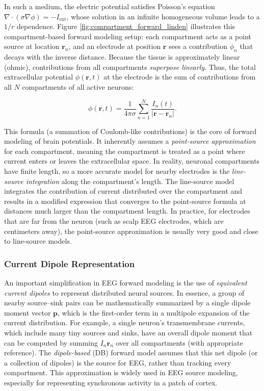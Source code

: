 \documentclass[final, a4paper,masters,en,listoffigures,listoftables,norwegiandates]{NMBU}
\begin{document}
In such a medium, the electric potential satisfies Poisson’s equation $\nabla \cdot (\sigma \nabla \phi) = -I_{\text{ext}}$, whose solution in an infinite homogeneous volume leads to a $1/r$ dependence. Figure \ref{fig:compartment_forward_linden} illustrates this compartment-based forward modeling setup: each compartment acts as a point source at location $\mathbf{r}_n$, and an electrode at position $\mathbf{r}$ sees a contribution $\phi_n$ that decays with the inverse distance. Because the tissue is approximately linear (ohmic), contributions from all compartments \textit{superpose linearly}. Thus, the total extracellular potential $\phi(\mathbf{r},t)$ at the electrode is the sum of contributions from all $N$ compartments of all active neurons:

\begin{equation}
\phi(\mathbf{r}, t) = \frac{1}{4\pi\sigma} \sum_{n=1}^{N} \frac{I_n(t)}{\lvert \mathbf{r} - \mathbf{r}_n \rvert}.
\label{eq:superposition}
\end{equation}

This formula (a summation of Coulomb-like contributions) is the core of forward modeling of brain potentials. It inherently assumes a \textit{point-source approximation} for each compartment, meaning the compartment is treated as a point where current enters or leaves the extracellular space. In reality, neuronal compartments have finite length, so a more accurate model for nearby electrodes is the \textit{line-source integration} along the compartment’s length. The line-source model integrates the contribution of current distributed over the compartment and results in a modified expression that converges to the point-source formula at distances much larger than the compartment length. In practice, for electrodes that are far from the neuron (such as scalp EEG electrodes, which are centimeters away), the point-source approximation is usually very good and close to line-source models.

\subsubsection{Current Dipole Representation}

An important simplification in EEG forward modeling is the use of \textit{equivalent current dipoles} to represent distributed neural sources. In essence, a group of nearby source–sink pairs can be mathematically summarized by a single dipole moment vector $\mathbf{p}$, which is the first-order term in a multipole expansion of the current distribution. For example, a single neuron’s transmembrane currents, which include many tiny sources and sinks, have an overall dipole moment that can be computed by summing $I_n \mathbf{r}_n$ over all compartments (with appropriate reference). The \textit{dipole-based} (DB) forward model assumes that this net dipole (or a collection of dipoles) is the source for EEG, rather than tracking every compartment. This approximation is widely used in EEG source modeling, especially for representing synchronous activity in a patch of cortex.
\end{document}
